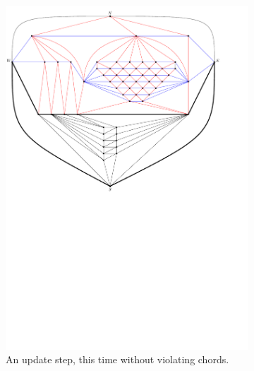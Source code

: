 \begin{figure}
    \ContinuedFloat
    \begin{subfigure}[b]{.9 \textwidth}
      \includegraphics[width=\textwidth]{examples/img/vertWorstCase/sweep5}
      \caption{An update step, this time without violating chords.}
      \label{fig:ex:vert:sweep5}
    \end{subfigure}
    ~
    \begin{subfigure}[b]{.9 \textwidth}

\end{subfigure}
\end{figure}
